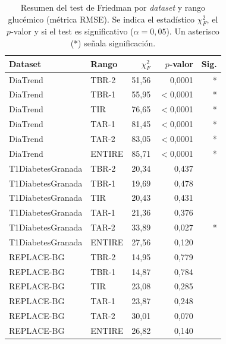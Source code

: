 \begin{table}[H]
\centering
\caption{Resumen del test de Friedman por \textit{dataset} y rango
         glucémico (métrica RMSE). Se indica el estadístico
         $\chi^2_F$, el $p$-valor y si el test es significativo
         ($\alpha = 0{,}05$). Un asterisco (*) señala significación.}
\label{tab:friedman_resumen}
\small
\begin{tabular}{llrrr}
\toprule
\textbf{Dataset} & \textbf{Rango} & $\chi^2_F$ & $p$-valor & \textbf{Sig.} \\
\midrule
DiaTrend & TBR-2   & 51{,}56 & 0{,}0001    & * \\
DiaTrend & TBR-1   & 55{,}95 & $<$0{,}0001 & * \\
DiaTrend & TIR     & 76{,}65 & $<$0{,}0001 & * \\
DiaTrend & TAR-1   & 81{,}45 & $<$0{,}0001 & * \\
DiaTrend & TAR-2   & 83{,}05 & $<$0{,}0001 & * \\
DiaTrend & ENTIRE  & 85{,}71 & $<$0{,}0001 & * \\
\midrule
T1DiabetesGranada & TBR-2  & 20{,}34 & 0{,}437 & \\
T1DiabetesGranada & TBR-1  & 19{,}69 & 0{,}478 & \\
T1DiabetesGranada & TIR    & 20{,}43 & 0{,}431 & \\
T1DiabetesGranada & TAR-1  & 21{,}36 & 0{,}376 & \\
T1DiabetesGranada & TAR-2  & 33{,}89 & 0{,}027 & * \\
T1DiabetesGranada & ENTIRE & 27{,}56 & 0{,}120 & \\
\midrule
REPLACE-BG & TBR-2  & 14{,}95 & 0{,}779 & \\
REPLACE-BG & TBR-1  & 14{,}87 & 0{,}784 & \\
REPLACE-BG & TIR    & 23{,}08 & 0{,}285 & \\
REPLACE-BG & TAR-1  & 23{,}87 & 0{,}248 & \\
REPLACE-BG & TAR-2  & 30{,}01 & 0{,}070 & \\
REPLACE-BG & ENTIRE & 26{,}82 & 0{,}140 & \\
\bottomrule
\end{tabular}
\end{table}



